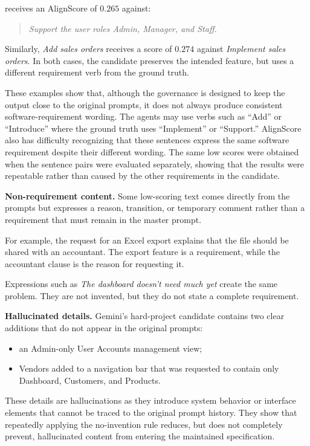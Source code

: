 receives an AlignScore of $0.265$ against:

\begin{quote}
\emph{Support the user roles Admin, Manager, and Staff.}
\end{quote}

Similarly, \emph{Add sales orders} receives a score of $0.274$ against
\emph{Implement sales orders}. In both cases, the candidate preserves the
intended feature, but uses a different requirement verb from the ground truth.

These examples show that, although the governance is designed to keep the
output close to the original prompts, it does not always produce consistent
software-requirement wording. The agents may use verbs such as ``Add'' or
``Introduce'' where the ground truth uses ``Implement'' or ``Support.''
AlignScore also has difficulty recognizing that these sentences express the
same software requirement despite their different wording. The same low
scores were obtained when the sentence pairs were evaluated separately,
showing that the results were repeatable rather than caused by the other
requirements in the candidate.

\textbf{Non-requirement content.}
Some low-scoring text comes directly from the prompts but expresses a reason,
transition, or temporary comment rather than a requirement that must remain in
the master prompt.

For example, the request for an Excel export explains that the file should be
shared with an accountant. The export feature is a requirement, while the
accountant clause is the reason for requesting it.

Expressions such as \emph{The dashboard doesn't need much yet} create the
same problem. They are not invented, but they do not state a complete
requirement.

\textbf{Hallucinated details.}
Gemini's hard-project candidate contains two clear additions that do not
appear in the original prompts:

\begin{itemize}[leftmargin=*]
  \item an Admin-only User Accounts management view;
  \item Vendors added to a navigation bar that was requested to contain only
  Dashboard, Customers, and Products.
\end{itemize}

These details are hallucinations as they introduce system behavior or
interface elements that cannot be traced to the original prompt history. They
show that repeatedly applying the no-invention rule reduces, but does not
completely prevent, hallucinated content from entering the maintained
specification.

